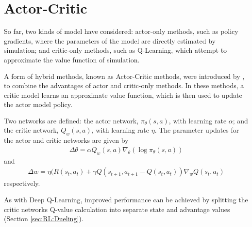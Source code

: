 \section{Actor-Critic}

So far, two kinds of model have considered:
actor-only methods, such as policy gradients, where the parameters of the model
are directly estimated by simulation;
and critic-only methods, such as Q-Learning, which attempt to approximate the
value function of simulation.

A form of hybrid methods, known as Actor-Critic methods, were introduced by
\cite{Konda:2000:Actor}, to combine the advantages of actor and critic-only
methods.
In these methods, a critic model learns an approximate value function, which is
then used to update the actor model policy.

Two networks are defined:
the actor network, $\pi_\theta(s,a)$, with learning rate $\alpha$;
and the critic network, $Q_w(s,a)$, with learning rate $\eta$.
The parameter updates for the actor and critic networks are given by
\begin{align*}
    \Delta\theta = \alpha Q_w(s,a)\nabla_\theta(\log\pi_\theta(s,a))
\end{align*}
and
\begin{align*}
    \Delta w = \eta (R(s_t,a_t) + \gamma Q(s_{t+1},a_{t+1} - Q(s_t,a_t))\nabla_wQ(s_t,a_t)
\end{align*}
respectively.

As with Deep Q-Learning, improved performance can be achieved by splitting the
critic networks Q-value calculation into separate state and advantage values
(Section \ref{sec:RL:Dueling}).

